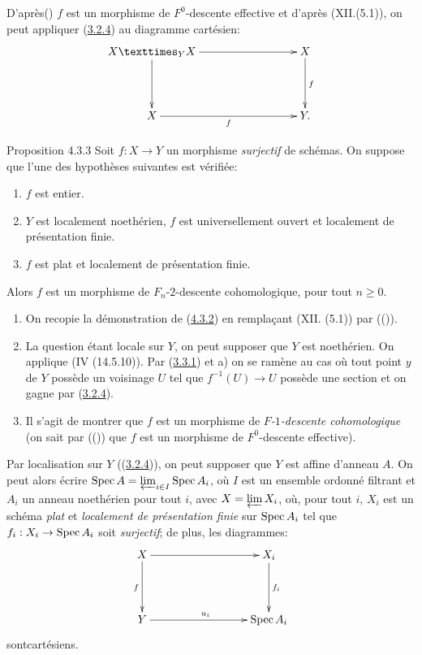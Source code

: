 \documentclass[10pt]{../fichiers-configuration-latex/smfart}
\begin{document}
D'après\pageoriginale () $f$ est un morphisme de
$F^{0}$-descente
effective et d'après (XII.(5.1)), on peut appliquer (\hyperref[Vbis.prop3.2.4]{3.2.4}) au
diagramme cartésien:
\[
\xymatrix@C=3cm@R=1.5cm{
  \fprod{X}{X}{Y} \ar[r] \ar[d]& X \ar[d]^{f}\\
X   \ar[r]_{f}            & Y.
}
\]

\begin{enonce*}{Proposition 4.3.3}
Soit $f : X \to Y$ un morphisme \emph{surjectif} de schémas. On suppose que
l'une des hypothèses suivantes est vérifiée:
\begin{enumerate}
\renewcommand{\theenumi}{\alph {enumi}}
\renewcommand{\labelenumi}{\theenumi)}
\item $f$ est entier.

\item $Y$ est localement noethérien, $f$ est universellement ouvert et
  localement de présentation finie.

\item $f$ est plat et localement de présentation finie.
\end{enumerate}
Alors $f$ est un morphisme de $F_n$-$2$-descente cohomologique, pour
tout $n \geq 0$.
\end{enonce*}

\begin{enumerate}
\renewcommand{\theenumi}{\alph {enumi}}
\renewcommand{\labelenumi}{\theenumi)}
\item On recopie la démonstration de (\hyperref[Vbis.prop4.3.2]{4.3.2}) en remplaçant
  (XII. (5.1)) par (()).

\item La question étant locale sur $Y$, on peut supposer que $Y$ est
  noethérien. On applique (\EGA IV (14.5.10)). Par (\hyperref[Vbis.prop3.3.1]{3.3.1}) et a) on
  se ramène au cas où tout point $y$ de $Y$ possède un voisinage $U$
  tel que $f^{-1} (U) \to U$ possède une section et on gagne par
  (\hyperref[Vbis.prop3.2.4]{3.2.4}).

\item Il s'agit de montrer que $f$ est un morphisme de
  \emph{$F$-$1$-descente cohomologique} (on sait par (()) que
  $f$ est un morphisme de $F^0$-descente effective).
\end{enumerate}

Par localisation sur $Y$ (\cf (\hyperref[Vbis.prop3.2.4]{3.2.4})), on peut supposer que $Y$ est
affine d'anneau $A$. On peut alors écrire $\operatorname{Spec} A =
\varprojlim_{i \in I} \operatorname{Spec} A_i$, où $I$ est un ensemble ordonné
filtrant et $A_{i}$ un anneau noethérien pour tout $i$, avec $X =
\varprojlim X_i$, où, pour tout $i$, $X_i$ est un schéma \emph{plat} et
\emph{localement de présentation finie} sur $\operatorname{Spec} A_i$ tel que $f_i : X_i
\to \Spec A_i$ soit \emph{surjectif}; de plus, les diagrammes:
\[
\xymatrix@C=3cm@R=1.5cm{
X \ar[r]\ar[d]_{f}& X_i \ar[d]^{f_i}\\
Y \ar[r]^{u_i}& \Spec A_i
}
\]
sont\pageoriginale cartésiens.
\end{document}
